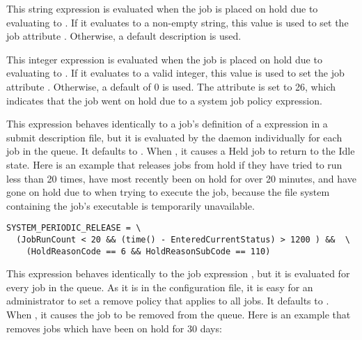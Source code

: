 \begin{description}
\label{param:SystemPeriodicHoldReason}
\item[\Macro{SYSTEM\_PERIODIC\_HOLD\_REASON}]
  This string expression is evaluated when the job is placed on hold
  due to  evaluating to .
  If it evaluates to a non-empty string, this value is used to set the
  job attribute .
  Otherwise, a default description is used.

\label{param:SystemPeriodicHoldSubCode}
\item[\Macro{SYSTEM\_PERIODIC\_HOLD\_SUBCODE}]
  This integer expression is evaluated when the job is placed on hold
  due to  evaluating to .
  If it evaluates to a valid integer, this value is used to set the job
  attribute .  
  Otherwise, a default of 0 is used.
  The attribute  is set to 26, which
  indicates that the job went on hold due to a system job policy expression.

\label{param:SystemPeriodicRelease}
\item[\Macro{SYSTEM\_PERIODIC\_RELEASE}]
  This expression behaves identically
  to a job's definition of a  expression
  in a submit description file,
  but it is evaluated by
  the  daemon individually for each job in the queue.
  It defaults to .
  When , it causes a Held job to return to the Idle state.
  Here is an example
  that releases jobs from hold if they have tried to run less than 20
  times, have most recently been on hold for over 20 minutes, and have
  gone on hold due to  when trying to execute
  the job, because the file system containing the job's executable is
  temporarily unavailable.

\footnotesize
\begin{verbatim}
SYSTEM_PERIODIC_RELEASE = \
  (JobRunCount < 20 && (time() - EnteredCurrentStatus) > 1200 ) &&  \
    (HoldReasonCode == 6 && HoldReasonSubCode == 110) 
\end{verbatim} 
\normalsize


  \label{param:SystemPeriodicRemove}
\item[\Macro{SYSTEM\_PERIODIC\_REMOVE}]
  This expression behaves identically
  to the job expression , but it is evaluated for
  every job in the queue.  As it is in the configuration file, it is
  easy for an administrator to set a remove policy that applies to all jobs.
  It defaults to \Expr{False}.
  When \Expr{True}, it causes the job to be removed from the queue.
  Here is an example
  that removes jobs which have been on hold for 30 days:


\end{description}
